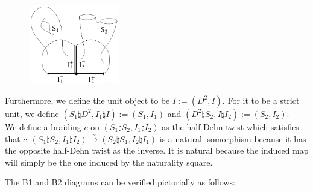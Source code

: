 \documentclass[reqno]{amsart}
\theoremstyle{definition}
\theoremstyle{remark}
\begin{document}
   \begin{figure}[htpb]
       \centering
       \includegraphics[width=0.35\textwidth]{connected-sum.png}
       \label{fig:connected-sum-png}
   \end{figure}

   Furthermore, we define the unit object to be
   $I := \left( D^2, I \right) $. For it to be a strict unit, 
   we define $\left( S_1 \natural D^2, I_1 \natural I \right) 
   := \left( S_1, I_1 \right) $ and
   $\left( D^2 \natural S_2, I \natural I_2 \right) :=
   \left( S_2, I_2 \right) $.\\
   

   We define a braiding $c$ on
   $\left( S_1 \natural S_2, I_1 \natural I_2 \right) $ 
   as the half-Dehn twist which satisfies that
   $c \colon \left( S_1 \natural S_2, I_1 \natural I_2 \right) 
   \stackrel{\sim}{\to } \left( S_2 \natural S_1, I_2 \natural I_1 \right)  $
   is a natural isomorphism because
   it has the opposite half-Dehn twist as the inverse. It is
   natural because the induced map will simply be the one induced by
   the naturality square.

   The B1 and B2 diagrams can be verified pictorially as follows:
\end{document}
